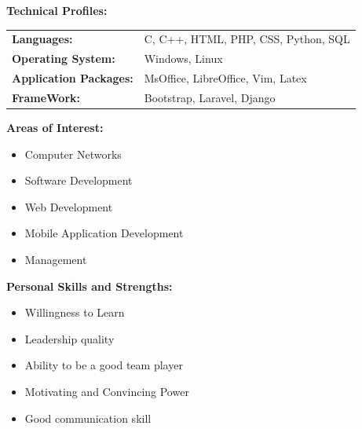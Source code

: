 \documentclass[a4paper, 12pt]{article}
\begin{document}
\vspace{8mm}
{\Large \textbf{ Technical Profiles: } \\
}
\begin{tabular}{l l}
	\textbf{Languages:} & C, C++, HTML, PHP, CSS, Python, SQL \\
	\textbf{Operating System:} & Windows, Linux \\
	\textbf{Application Packages:} & MsOffice, LibreOffice, Vim, Latex \\ 
	\textbf{FrameWork: } & Bootstrap, Laravel, Django \\
	
\end{tabular}

\vspace{8mm}
{\Large \textbf{Areas of Interest:} \\
}
\vspace{-5mm}
\begin{itemize}[noitemsep]
\addtolength{\leftskip}{8mm}	
	\item Computer Networks
	\item Software Development
	\item Web Development
	\item Mobile Application Development
	\item Management

\end{itemize}

\vspace{8mm}
{\Large \textbf{Personal Skills and Strengths:}\\
}
\vspace{-5mm}
\begin{itemize}[noitemsep]
\addtolength{\leftskip}{8mm}
	\item Willingness to Learn
	\item Leadership quality
	\item Ability to be a good team player
	\item Motivating and Convincing Power
	\item Good communication skill
\end{itemize}

\vspace{8mm}
\end{document}
